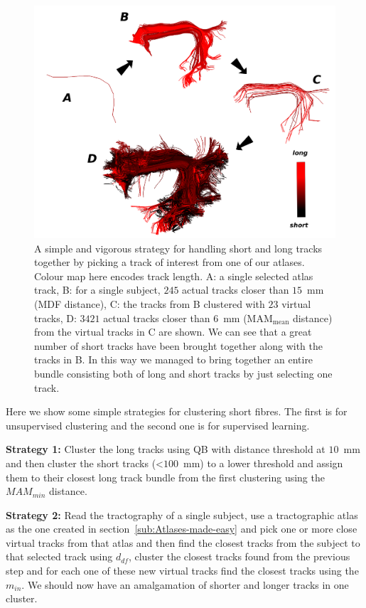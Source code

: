\documentclass[preprint,authoryear,a4paper,10pt,onecolumn]{elsarticle}
\begin{document}
%
\begin{figure}
\begin{centering}
\includegraphics[scale=0.7]{last_figures/arcuate_small_fibers}
\par\end{centering}
\caption{A simple and vigorous strategy for handling short and long
  tracks together by picking a track of interest from one of our
  atlases. Colour map here encodes track length. A: a single selected
  atlas track, B: for a single subject, $245$ actual tracks closer than
  $15$~mm (MDF distance), C: the tracks from B clustered with $23$
  virtual tracks, D: $3421$ actual tracks closer than $6$~mm
  ($\textrm{MAM}_{\textrm{mean}}$ distance) from the virtual tracks in C
  are shown. We can see that a great number of short tracks have been
  brought together along with the tracks in B. In this way we managed to
  bring together an entire bundle consisting both of long and short
  tracks by just selecting one track.\label{Flo:arcuate_close}}
\end{figure}


Here we show some simple strategies for clustering short fibres. The first
is for unsupervised clustering and the second one is for supervised
learning.

\textbf{Strategy 1:} Cluster the long tracks using QB with distance
threshold at $10$~mm and then cluster the short tracks (<$100$~mm) to a
lower threshold and assign them to their closest long track bundle from
the first clustering using the $MAM_{min}$ distance.

\textbf{Strategy 2:} Read the tractography of a single subject, use a
tractographic atlas as the one created in
section~\ref{sub:Atlases-made-easy} and pick one or more close virtual
tracks from that atlas and then find the closest tracks from the subject
to that selected track using $d_{df}$, cluster the closest tracks found
from the previous step and for each one of these new virtual tracks find
the closest tracks using the $m_{in}$. We should now have an
amalgamation of shorter and longer tracks in one cluster.
\end{document}

